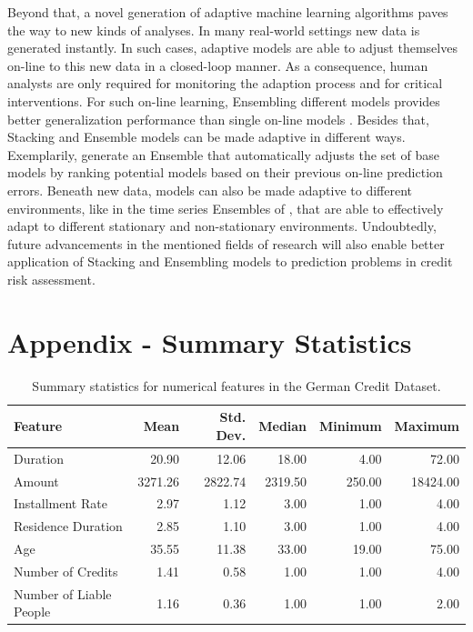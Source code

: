 \documentclass[12pt]{article}
\begin{document}
Beyond that, a novel generation of adaptive machine learning algorithms paves the way to new kinds of analyses. In many real-world settings new data is generated instantly. In such cases, adaptive models are able to adjust themselves on-line to this new data in a closed-loop manner. As a consequence, human analysts are only required for monitoring the adaption process and for critical interventions. For such on-line learning, Ensembling different models provides better generalization performance than single on-line models \citep[p.1-6]{soares2016adaptive}. Besides that, Stacking and Ensemble models can be made adaptive in different ways. Exemplarily, \cite{soares2016adaptive} generate an Ensemble that automatically adjusts the set of base models by ranking potential models based on their previous on-line prediction errors. Beneath new data, models can also be made adaptive to different environments, like in the time series Ensembles of \cite{van2009adaptive}, that are able to effectively adapt to different stationary and non-stationary environments. Undoubtedly, future advancements in the mentioned fields of research will also enable better application of Stacking and Ensembling models to prediction problems in credit risk assessment.







\newpage
\appendix
\section{Appendix - Summary Statistics}\label{appendixa}

\begin{table}[ht]
\centering
\begin{tabular}{lrrrrr}
  \hline
 Feature & Mean & Std. Dev. & Median & Minimum & Maximum \\ 
  \hline
Duration & 20.90 & 12.06 & 18.00 & 4.00 & 72.00 \\ 
  Amount & 3271.26 & 2822.74 & 2319.50 & 250.00 & 18424.00 \\ 
  Installment Rate & 2.97 & 1.12 & 3.00 & 1.00 & 4.00 \\ 
  Residence Duration & 2.85 & 1.10 & 3.00 & 1.00 & 4.00 \\ 
  Age & 35.55 & 11.38 & 33.00 & 19.00 & 75.00 \\ 
  Number of Credits & 1.41 & 0.58 & 1.00 & 1.00 & 4.00 \\ 
  Number of Liable People & 1.16 & 0.36 & 1.00 & 1.00 & 2.00 \\ 
   \hline
\end{tabular}
\caption[Summary Statistics for Numerical Features]{Summary statistics for numerical features in the German Credit Dataset.}\label{summary_numeric}
\end{table}
\end{document}
